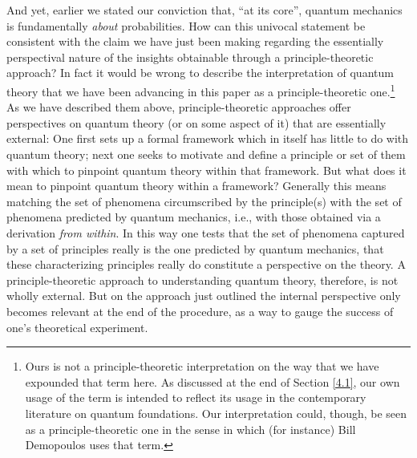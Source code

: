 And yet, earlier we stated our conviction that, ``at its core'', quantum mechanics is fundamentally \emph{about} probabilities. How can this univocal statement be consistent with the claim we have just been making regarding the essentially perspectival nature of the insights obtainable through a principle-theoretic approach? In fact it would be wrong to describe the interpretation of quantum theory that we have been advancing in this paper as a principle-theoretic one.\footnote{Ours is not a principle-theoretic interpretation on the way that we have expounded that term here. As discussed at the end of Section \ref{4.1}, our own usage of the term is intended to reflect its usage in the contemporary literature on quantum foundations. Our interpretation could, though, be seen as a principle-theoretic one in the sense in which (for instance) Bill Demopoulos uses that term.} As we have described them above, principle-theoretic approaches offer perspectives on quantum theory (or on some aspect of it) that are essentially external: One first sets up a formal framework which in itself has little to do with quantum theory; next one seeks to motivate and define a principle or set of them with which to pinpoint quantum theory within that framework. But what does it mean to pinpoint quantum theory within a framework? Generally this means matching the set of phenomena circumscribed by the principle(s) with the set of phenomena predicted by quantum mechanics, i.e., with those obtained via a derivation \emph{from within}. In this way one tests that the set of phenomena captured by a set of principles really is the one predicted by quantum mechanics, that these characterizing principles really do constitute a perspective on the theory. A principle-theoretic approach to understanding quantum theory, therefore, is not wholly external. But on the approach just outlined the internal perspective only becomes relevant at the end of the procedure, as a way to gauge the success of one's theoretical experiment.

